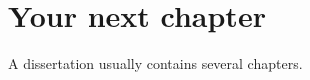 \documentclass[main.tex]{subfiles}
\begin{document}
\chapter{Your next chapter}
    A dissertation usually contains several chapters.
\end{document}
